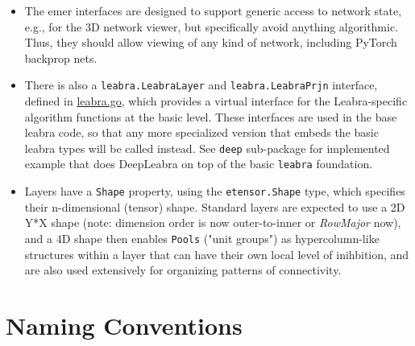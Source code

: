 \begin{Shaded}
\begin{Highlighting}[]
 \OperatorTok{(}\OperatorTok{*}\OperatorTok{)}\OperatorTok{()} \OperatorTok{\{}
    \NormalTok{ \_}\OperatorTok{,}\OperatorTok{:=} \OperatorTok{\{}
        \OperatorTok{()} \OperatorTok{\{}
        \OperatorTok{\}}
\OperatorTok{()} 
    \OperatorTok{\}}
\OperatorTok{\}}
\end{Highlighting}
\end{Shaded}

\begin{itemize}
\item
  The emer interfaces are designed to support generic access to network
  state, e.g., for the 3D network viewer, but specifically avoid
  anything algorithmic. Thus, they should allow viewing of any kind of
  network, including PyTorch backprop nets.
\item
  There is also a \texttt{leabra.LeabraLayer} and
  \texttt{leabra.LeabraPrjn} interface, defined in
  \href{https://github.com/emer/leabra/blob/master/leabra/leabra.go}{leabra.go},
  which provides a virtual interface for the Leabra-specific algorithm
  functions at the basic level. These interfaces are used in the base
  leabra code, so that any more specialized version that embeds the
  basic leabra types will be called instead. See \texttt{deep}
  sub-package for implemented example that does DeepLeabra on top of the
  basic \texttt{leabra} foundation.
\item
  Layers have a \texttt{Shape} property, using the
  \texttt{etensor.Shape} type, which specifies their n-dimensional
  (tensor) shape. Standard layers are expected to use a 2D Y*X shape
  (note: dimension order is now outer-to-inner or \emph{RowMajor} now),
  and a 4D shape then enables \texttt{Pools} ("unit groups") as
  hypercolumn-like structures within a layer that can have their own
  local level of inihbition, and are also used extensively for
  organizing patterns of connectivity.
\end{itemize}

\hypertarget{naming-conventions}{%
\section{Naming Conventions}\label{naming-conventions}}

